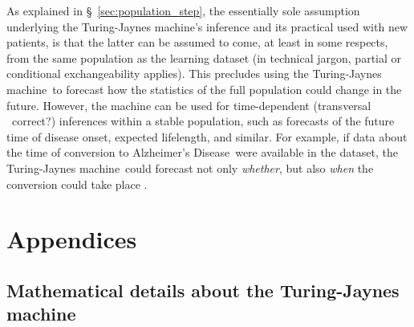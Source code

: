\documentclass[utf8]{FrontiersinHarvard} %
\newcommand*{\puzzle}{{\fontencoding{U}\fontfamily{fontawesometwo}\selectfont\symbol{225}}}
\newcommand{\mynotez}[1]{{\color{notecolour}\puzzle\ #1}}
\newcommand*{\sect}{\S}%
\newcommand*{\eg}{{e.g.}}
\newcommand*{\cf}{{cf.}}
\renewcommand*{\|}[1][]{\nonscript\:#1\vert\nonscript\:\mathopen{}}
\newcommand*{\ad}{Alzheimer's Disease}
\newcommand*{\tjm}{Turing-Jaynes machine}
\begin{document}
As explained in \sect~\ref{sec:population_step}, the essentially sole assumption underlying the \tjm's inference and its practical used with new patients, is that the latter can be assumed to come, at least in some respects, from the same population as the learning dataset (in technical jargon, partial or conditional exchangeability applies). This precludes using the \tjm\ to forecast how the statistics of the full population could change in the future. However, the machine can be used for time-dependent (transversal \mynotez{correct?}) inferences within a stable population, such as forecasts of the future time of disease onset, expected lifelength, and similar. For example, if data about the time of conversion to \ad\ were available in the dataset, the \tjm\ could forecast not only \emph{whether}, but also \emph{when} the conversion could take place \citep[\cf\ \eg][]{delacruzmesiaetal2007}.

\appendix
\renewcommand\thesection{\Alph{section}}
\section{Appendices}
\label{sec:appendices}

\subsection{Mathematical details about the \tjm}
\label{sec:maths_tjm}

\end{document}
